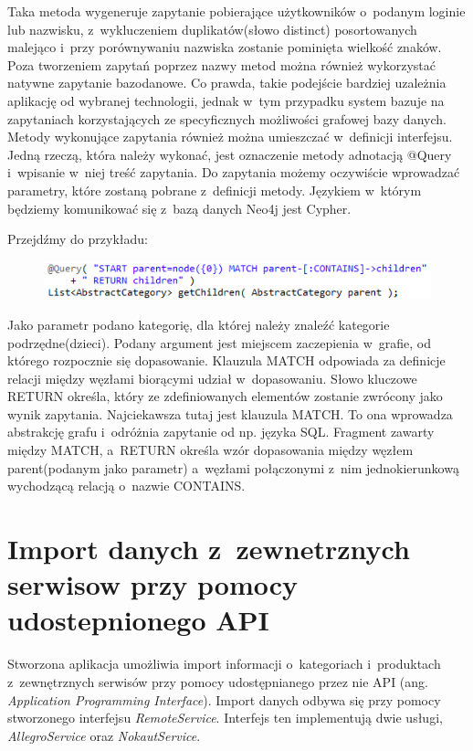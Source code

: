 Taka metoda wygeneruje zapytanie pobierające użytkowników o~podanym loginie lub nazwisku, z~wykluczeniem duplikatów(słowo distinct) posortowanych malejąco i~przy porównywaniu nazwiska zostanie pominięta wielkość znaków. 
Poza tworzeniem zapytań poprzez nazwy metod można również wykorzystać natywne zapytanie bazodanowe. Co prawda, takie podejście bardziej uzależnia aplikację od wybranej technologii, jednak w~tym przypadku system bazuje na zapytaniach korzystających ze specyficznych możliwości grafowej bazy danych. Metody wykonujące zapytania również można umieszczać w~definicji interfejsu. Jedną rzeczą, która należy wykonać, jest oznaczenie metody adnotacją @Query i~wpisanie w~niej treść zapytania. Do zapytania możemy oczywiście wprowadzać parametry, które zostaną pobrane z~definicji metody. Językiem w~którym będziemy komunikować się z~bazą danych Neo4j jest Cypher. 

Przejdźmy do przykładu:

\begin{figure}[H]
	\centering
	\includegraphics{images/query.png}
\end{figure}

Jako parametr podano kategorię, dla której należy znaleźć kategorie podrzędne(dzieci). Podany argument jest miejscem zaczepienia w~grafie, od którego rozpocznie się dopasowanie. Klauzula MATCH odpowiada za definicje relacji między węzłami biorącymi udział w~dopasowaniu. Słowo kluczowe RETURN określa, który ze zdefiniowanych elementów zostanie zwrócony jako wynik zapytania. Najciekawsza tutaj jest klauzula MATCH. To ona wprowadza abstrakcję grafu i~odróżnia zapytanie od np. języka SQL. Fragment zawarty między MATCH, a~RETURN określa wzór dopasowania między węzłem parent(podanym jako parametr) a~węzłami połączonymi z~nim jednokierunkową wychodzącą relacją o~nazwie CONTAINS. 

\section{Import danych z~zewnetrznych serwisow przy pomocy udostepnionego API}

Stworzona aplikacja umożliwia import informacji o~kategoriach i~produktach z~zewnętrznych serwisów przy pomocy udostępnianego przez nie API (ang. \textit{Application Programming Interface}). Import danych odbywa się przy pomocy stworzonego interfejsu \textit{RemoteService}. Interfejs ten implementują dwie usługi, \textit{AllegroService} oraz \textit{NokautService}.

